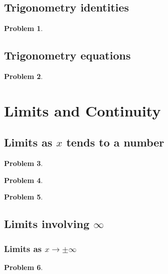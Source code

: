 \documentclass{article}
\newtheorem{problem}{Problem}
\begin{document}
\subsection{Trigonometry identities}
\begin{problem}

\end{problem}

\subsection{Trigonometry equations}
\begin{problem}

\end{problem}


\section{Limits and Continuity}
\subsection{Limits as $x$ tends to a number}\label{secMPSlimitsXtendsToNumer}
\begin{problem}

\end{problem}

\begin{problem}

\end{problem}
\begin{problem}

\end{problem}
\subsection{Limits involving $\infty $}
\subsubsection{Limits as $x\to\pm \infty$}\label{secMPSlimitsXtoInfty}
\begin{problem}

\end{problem}

\end{document}
